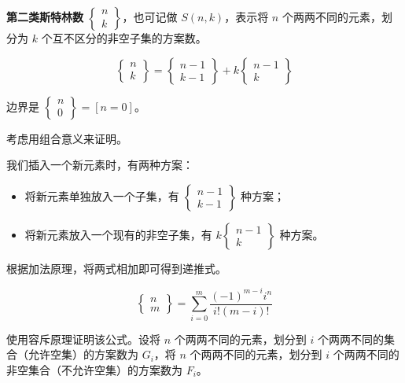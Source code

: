
\textbf{第二类斯特林数} $\begin{Bmatrix}n\\ k\end{Bmatrix}$，也可记做 $S(n,k)$，表示将 $n$ 个两两不同的元素，划分为 $k$ 个互不区分的非空子集的方案数。


$$
\begin{Bmatrix}n\\ k\end{Bmatrix}=\begin{Bmatrix}n-1\\ k-1\end{Bmatrix}+k\begin{Bmatrix}n-1\\ k\end{Bmatrix}
$$

边界是 $\begin{Bmatrix}n\\ 0\end{Bmatrix}=[n=0]$。

考虑用组合意义来证明。

我们插入一个新元素时，有两种方案：

\begin{itemize}
    \item 将新元素单独放入一个子集，有 $\begin{Bmatrix}n-1\\ k-1\end{Bmatrix}$ 种方案；
    \item 将新元素放入一个现有的非空子集，有 $k\begin{Bmatrix}n-1\\ k\end{Bmatrix}$ 种方案。
\end{itemize}

根据加法原理，将两式相加即可得到递推式。


$$
\begin{Bmatrix}n\\m\end{Bmatrix}=\sum\limits_{i=0}^m\dfrac{(-1)^{m-i}i^n}{i!(m-i)!}
$$

使用容斥原理证明该公式。设将 $n$ 个两两不同的元素，划分到 $i$ 个两两不同的集合（允许空集）的方案数为 $G_i$，将 $n$ 个两两不同的元素，划分到 $i$ 个两两不同的非空集合（不允许空集）的方案数为 $F_i$。

